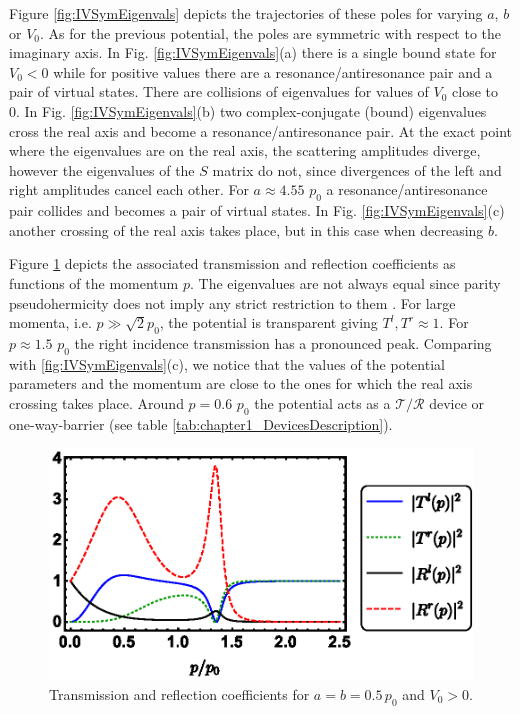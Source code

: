 Figure \ref{fig:IVSymEigenvals} depicts the trajectories of these poles for varying $a$, $b$ or $V_0$. As for the previous potential, the poles are symmetric with respect to the imaginary axis. In Fig. \ref{fig:IVSymEigenvals}(a) there is a single bound state for $V_0<0$ while for positive values there are a resonance/antiresonance pair and a pair of virtual states. There are collisions of eigenvalues for values of $V_0$ close to 0. In Fig. \ref{fig:IVSymEigenvals}(b)  two complex-conjugate (bound) eigenvalues cross the real axis and become a resonance/antiresonance pair. At the exact point where the eigenvalues are on the real axis, the scattering amplitudes diverge, however the eigenvalues of the $S$ matrix do not, since divergences of the left and right amplitudes cancel each other. For $a  \approx 4.55$ $p_0$ a resonance/antiresonance pair collides and becomes a pair of virtual states. In Fig. \ref{fig:IVSymEigenvals}(c) another crossing of the real axis takes place, but in this case when decreasing $b$.

Figure \ref{fig:T_R_fig2} depicts the associated transmission and reflection coefficients as functions of the momentum $p$. The eigenvalues are not always equal since parity pseudohermicity does not imply any strict restriction to them \cite{Ruschhaupt2017}. For large  momenta, i.e. $p \gg \sqrt{2} p_0$, the potential is transparent giving $T^l,T^r \approx 1$. For $p\approx 1.5$ $p_0$ the right incidence transmission has a pronounced peak. Comparing with \ref{fig:IVSymEigenvals}(c), we notice that the values of the potential parameters and the momentum are close to the ones for which the real axis crossing takes place. Around $p = 0.6$ $p_0$ the potential acts as a $\mathcal{T}/\mathcal{R}$ device or one-way-barrier (see table \ref{tab:chapter1_DevicesDescription}).


\begin{figure}[t]
\begin{center}
  \includegraphics[width=0.75\linewidth]{Figures/IVSymTR.eps}
\end{center}
\caption{ Transmission and reflection coefficients for $a=b=0.5\, p_0$ and $V_0>0$.}
\label{fig:T_R_fig2}
\end{figure}


